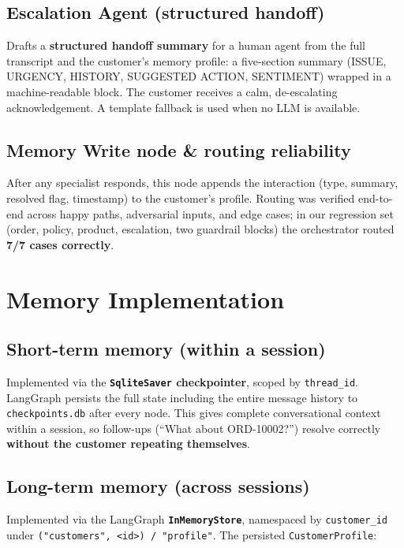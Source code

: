 \documentclass[11pt,a4paper]{article}
\newcommand{\code}[1]{\texttt{#1}}
\begin{document}
\subsection{Escalation Agent (structured handoff)}
Drafts a \textbf{structured handoff summary} for a human agent from the full transcript and the
customer's memory profile: a five-section summary (ISSUE, URGENCY, HISTORY, SUGGESTED ACTION,
SENTIMENT) wrapped in a machine-readable block. The customer receives a calm, de-escalating
acknowledgement. A template fallback is used when no LLM is available.

\subsection{Memory Write node \& routing reliability}
After any specialist responds, this node appends the interaction (type, summary, resolved flag,
timestamp) to the customer's profile. Routing was verified end-to-end across happy paths,
adversarial inputs, and edge cases; in our regression set (order, policy, product, escalation, two
guardrail blocks) the orchestrator routed \textbf{7/7 cases correctly}.

\section{Memory Implementation}

\subsection{Short-term memory (within a session)}
Implemented via the \textbf{\code{SqliteSaver} checkpointer}, scoped by \code{thread\_id}.
LangGraph persists the full state \textemdash{} including the entire message history \textemdash{}
to \code{checkpoints.db} after every node. This gives complete conversational context within a
session, so follow-ups (``What about ORD-10002?'') resolve correctly \textbf{without the customer
repeating themselves}.

\subsection{Long-term memory (across sessions)}
Implemented via the LangGraph \textbf{\code{InMemoryStore}}, namespaced by \code{customer\_id}
under \code{("customers", <id>) / "profile"}. The persisted \code{CustomerProfile}:
\end{document}
